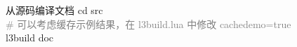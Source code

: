 \begin{frame}
{\begin{columns}
\begin{column}{0.7\textwidth}

        \begin{exampleblock}{\faTerminal{} 从源码编译文档}
          \ttfamily\footnotesize
          cd src\\
          \textcolor{gray}{\# 可以考虑缓存示例结果，在 l3build.lua 中修改 cachedemo=true} \\
          l3build doc
        \end{exampleblock}
      \end{column}
      \begin{column}{0.3\textwidth}
      \end{column}
    \end{columns}
  }


\end{frame}
